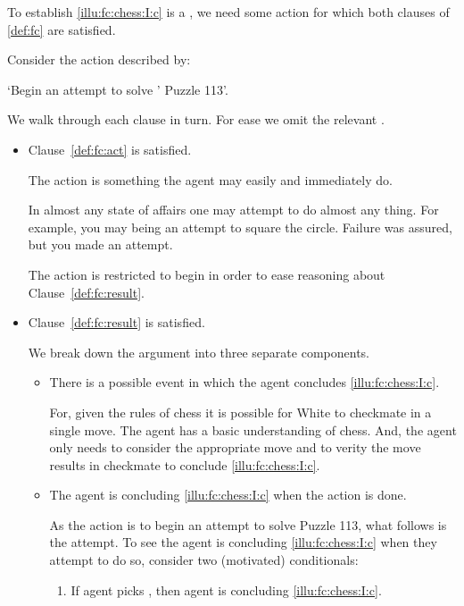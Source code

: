 \begin{note}
  To establish \ref{illu:fc:chess:I:c} is a \fc{}, we need some action for which both clauses of \autoref{def:fc} are satisfied.

  Consider the action described by:

  \begin{center}
    `Begin an attempt to solve \citeauthor{Emms:2000aa}' Puzzle 113'.
  \end{center}

  \noindent We walk through each clause in turn.
  For ease we omit the relevant \pool{}.

  \begin{itemize}[leftmargin=*]
  \item
    Clause~\ref{def:fc:act} is satisfied.

    The action is something the agent may easily and immediately do.

    In almost any state of affairs one may attempt to do almost any thing.
    For example, you may being an attempt to square the circle.
    Failure was assured, but you made an attempt.

    The action is restricted to begin in order to ease reasoning about Clause~\ref{def:fc:result}.
  \item
    Clause~\ref{def:fc:result} is satisfied.

    We break down the argument into three separate components.

    \begin{itemize}
    \item
      There is a possible event in which the agent concludes \ref{illu:fc:chess:I:c}.

      For, given the rules of chess it is possible for White to checkmate in a single move.
      The agent has a basic understanding of chess.
      And, the agent only needs to consider the appropriate move and to verity the move results in checkmate to conclude \autoref{illu:fc:chess:I:c}.

    \item
      The agent is concluding \ref{illu:fc:chess:I:c} when the action is done.

      As the action is to begin an attempt to solve Puzzle 113, what follows is the attempt.
      To see the agent is concluding \ref{illu:fc:chess:I:c} when they attempt to do so, consider two (motivated) conditionals:

      \begin{enumerate}[label=\arabic*., ref=(\arabic*)]
      \item
        \label{illu:fc:chess:I:cond:1}
        If agent picks , then agent is concluding \ref{illu:fc:chess:I:c}.%
        \smallskip


\end{enumerate}
\end{itemize}
\end{itemize}
\end{note}
